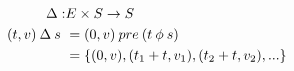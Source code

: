 \documentclass[preview]{standalone}
\begin{document}
\begin{align*}
    \mathbin{\Delta} : & E  \times S \rightarrow S\\
    (t,v) \mathbin{\Delta} s\ & = (0,v) \mathbin{pre} (t \mathbin{\phi} s)\\
    &=\{(0,v),(t_1+t,v_1),(t_2+t,v_2),...\}\nonumber
\end{align*}
\end{document}
